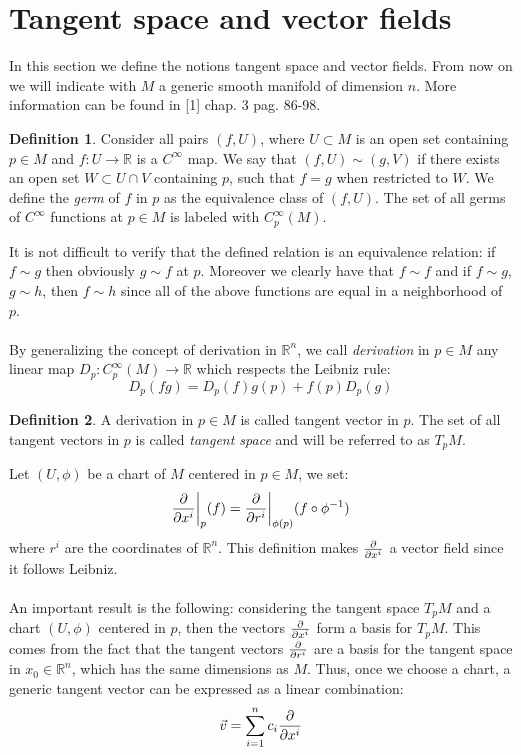 \documentclass[12pt,a4paper]{report}
\theoremstyle{definition}
\newtheorem{Def}{Definition}[chapter]
\theoremstyle{Theorem}
\theoremstyle{definition}
\theoremstyle{definition}
\begin{document}
	\section{Tangent space and vector fields}\label{Sec_1.3}
	In this section we define the notions tangent space and vector fields. From now on we will indicate with $M$ a generic smooth manifold of dimension $n$. More information can be found in [1] chap. 3 pag. 86-98.
	\begin{Def}
		Consider all pairs $(f,U)$, where $U\subset M$ is an open set containing $p\in M$ and $f:U\rightarrow \mathbb{R}$ is a $C^\infty$ map. We say that $(f,U)\sim(g,V)$ if there exists an open set $W\subset U\cap V$ containing $p$, such that $f=g$ when restricted to $W$. We define the \textit{germ} of $f$ in $p$ as the equivalence class of $(f,U)$.
		The set of all germs of $C^\infty$ functions at $p\in M$ is labeled with $C^\infty_p(M)$.
	\end{Def}
	It is not difficult to verify that the defined relation is an equivalence relation: if $f\sim g$ then obviously $g\sim f$ at $p$. Moreover we clearly have that $f\sim f$ and if $f\sim g$, $g\sim h$, then $f\sim h$ since all of the above functions are equal in a neighborhood of $p$.\\
	\\
	By generalizing the concept of derivation in $\mathbb{R}^n$, we call \textit{derivation} in $p\in M$ any linear map $D_p:C^\infty_p(M)\rightarrow\mathbb{R}$ which respects the Leibniz rule:
	$$D_p(fg)=D_p(f)g(p)+f(p)D_p(g)$$
	\begin{Def}
		A derivation in $p\in M$ is called tangent vector in $p$. The set of all tangent vectors in $p$ is called \textit{tangent space} and will be referred to as $T_pM$.
	\end{Def} 
	Let $(U,\phi)$ be a chart of $M$ centered in $p\in M$, we set:
	$${\partial\over \partial x^i}\bigg\rvert_p(f)={\partial\over \partial r^i}\bigg\rvert_{\phi(p)}(f\circ \phi^{-1})$$ where $r^i$ are the coordinates of $\mathbb{R}^n$. This definition makes ${\partial\over \partial x^i}$ a vector field since it follows Leibniz.\\
	\\
	An important result is the following: considering the tangent space $T_pM$ and a chart $(U,\phi)$ centered in $p$, then the vectors $\partial\over \partial x^i$ form a basis for $T_pM$. This comes from the fact that the tangent vectors $\partial\over \partial r^i$ are a basis for the tangent space in $x_0\in\mathbb{R}^n$, which has the same dimensions as $M$. Thus, once we choose a chart, a generic tangent vector can be expressed as a linear combination: $$\vec{v}=\sum_{i=1}^{n}c_i{\partial\over \partial x^i}$$ 
\end{document}
